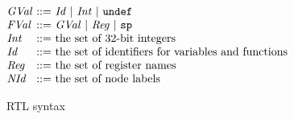 \begin{figure}
\[
\begin{array}{@{}l@{~}c@{~}l@{~~}lr@{}}
\rtlGVal&::=&\multicolumn{2}{@{}l@{}}{\rtlId ~|~ \rtlInt ~|~ \rtlundef}\\
\rtlFVal&::=&\multicolumn{2}{@{}l@{}}{\rtlGVal ~|~ \rtlReg ~|~ \rtlsp}\\
\rtlInt&::=&\multicolumn{2}{@{}l@{}}{\text{the set of 32-bit integers}}\\
\rtlId&::=&\multicolumn{2}{@{}l@{}}{\text{the set of identifiers for variables and functions \qquad\qquad\qquad}}\\
\rtlReg&::=&\multicolumn{2}{@{}l@{}}{\text{the set of register names}}\\
\rtlNId&::=&\multicolumn{2}{@{}l@{}}{\text{the set of node labels}}\\
\end{array}
\]
\caption{RTL syntax}
\label{fig:rtl-syntax}
\end{figure}


